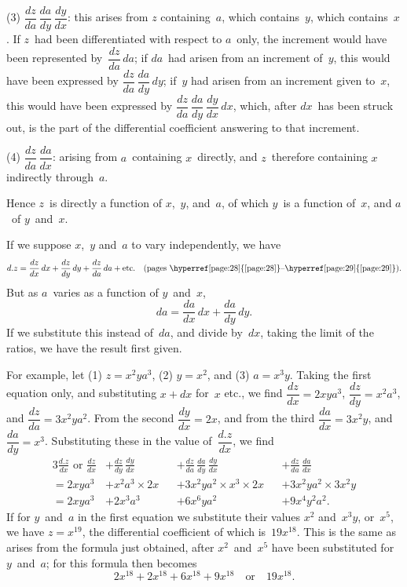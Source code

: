 \documentclass[12pt]{book}[2005/09/16]
\newcommand{\Chg}[2]{#2}
\newcommand{\Add}[1]{\Chg{}{#1}}
\newcommand{\Pagelabel}[1]{\phantomsection\label{page:#1}}
\newcommand{\PageSep}[1]{\Pagelabel{#1}\ignorespaces}
\newcommand{\PageRefs}[3][pages]{%
  \ifthenelse{\equal{\pageref*{page:#2}}{\pageref*{page:#3}}}{%
    \hyperref[page:#2]{page~\pageref*{page:#2}}%
  }{%
    #1 \hyperref[page:#2]{\pageref*{page:#2}}--\hyperref[page:#3]{\pageref*{page:#3}}%
  }%
}
\renewcommand{\etc}{\text{etc}}
\renewcommand{\(}{{\upshape(}}
\renewcommand{\)}{{\upshape)}}
\begin{document}
(3) $\dfrac{dz}{da}\, \dfrac{da}{dy}\, \dfrac{dy}{dx}$: this arises from $z$ containing~$a$, which
contains~$y$, which contains~$x$. If $z$~had been differentiated
with respect to $a$~only, the increment would
have been represented by~$\dfrac{dz}{da}\, da$; if $da$~had arisen from
an increment of~$y$, this would have been expressed by
$\dfrac{dz}{da}\, \dfrac{da}{dy}\, dy$; if~$y$ had arisen from an increment given to~$x$,
this would have been expressed by $\dfrac{dz}{da}\, \dfrac{da}{dy}\, \dfrac{dy}{dx}\, dx$,
which, after $dx$~has been struck out, is the part of the
differential coefficient answering to that increment.

(4) $\dfrac{dz}{da}\, \dfrac{da}{dx}$: arising from $a$~containing $x$~directly,
and $z$~therefore containing $x$ indirectly through~$a$.

Hence $z$~is directly a function of $x$,~$y$, and~$a$, of
which $y$~is a function of~$x$, and $a$~of $y$~and~$x$.

If we suppose $x$,~$y$ and~$a$ to vary independently,
we have
\[
d.z = \frac{dz}{dx}\, dx + \frac{dz}{dy}\, dy + \frac{dz}{da}\, da + \etc.
\quad\text{(\PageRefs{28}{29})}.
\]
But as $a$~varies as a function of $y$~and~$x$,
\[
da = \frac{da}{dx}\, dx + \frac{da}{dy}\, dy.
\]
If we substitute this instead of~$da$, and divide by~$dx$,
taking the limit of the ratios, we have the result first
given.

For example, let (1) $z = x^{2} ya^{3}$, (2) $y = x^{2}$, and (3) $a = x^{3} y$.
Taking the first equation only, and substituting
\PageSep{99}
$x + dx$ for~$x$ etc., we find $\dfrac{dz}{dx} = 2xya^{3}$, $\dfrac{dz}{dy} = x^{2} a^{3}$,
and $\dfrac{dz}{da} = 3x^{2} ya^{2}$. From the second $\dfrac{dy}{dx} = 2x$, and from
the third $\dfrac{da}{dx} = 3x^{2} y$, and $\dfrac{da}{dy} = x^{3}$. Substituting these
in the value of~$\dfrac{d.z}{dx}$, we find
\begin{alignat*}{3}
\frac{d.z}{dx} \text{ \ or \ }
   \frac{dz}{dx} &+ \frac{dz}{dy}\, \frac{dy}{dx}
    &&+ \frac{dz}{da}\, \frac{da}{dy}\, \frac{dy}{dx}
    &&+ \frac{dz}{da}\, \frac{da}{dx} \\
  = 2xya^{3} &+ x^{2} a^{3} × 2x &&+ 3x^{2} ya^{2} × x^{3} × 2x &&+ 3x^{2} ya^{2} × 3x^{2} y \\
  = 2xya^{3} &+ 2x^{3} a^{3} &&+ 6x^{6} ya^{2} &&+ 9x^{4} y^{2} a^{2}\Add{.}
\end{alignat*}
If for $y$~and~$a$ in the first equation we substitute their
values $x^{2}$ and~$x^{3} y$, or~$x^{5}$, we have $z = x^{19}$, the differential
coefficient of which\Add{ is}~$19x^{18}$. This is the same as
arises from the formula just obtained, after $x^{2}$~and~$x^{5}$
have been substituted for $y$~and~$a$; for this formula
then becomes
\[
2x^{18} + 2x^{18} + 6x^{18} + 9x^{18} \quad\text{or}\quad 19x^{18}.
\]
\end{document}
